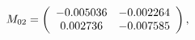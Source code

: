 \begin{equation}
M_{02}=
\left(
\begin{array}{c c}
-0.005036&
-0.002264\\
0.002736&
-0.007585\\
\end{array}
\right),
\end{equation}

